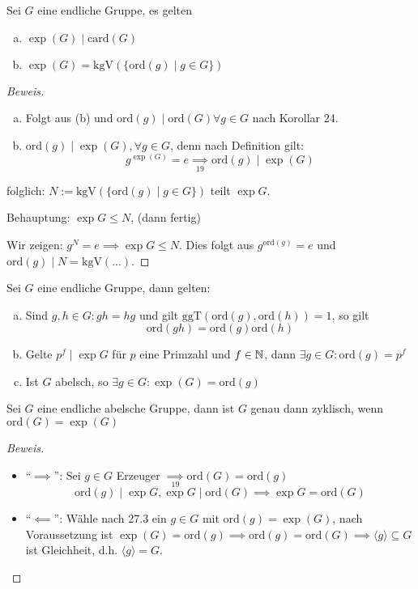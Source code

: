 \documentclass[a4paper]{report}
\begin{document}
\begin{satz}
  Sei $G$ eine endliche Gruppe, es gelten
  \begin{enumerate}[(a)]
    \item $\exp(G) \mid \mathrm{card}(G)$
    \item $\exp(G) = \mathrm{kgV}(\{\mathrm{ord}(g)\mid g \in G\})$
  \end{enumerate}
\begin{proof}[Beweis] \item
\begin{enumerate}[(a)]
\item Folgt aus (b) und $\mathrm{ord}(g) \mid \mathrm{ord}(G) \forall g \in G$ nach Korollar 24.
\item $\mathrm{ord}(g) \mid \exp(G), \forall g \in G$, denn nach Definition gilt:
$$g^{\exp(G)} = e \underset{19} \implies \mathrm{ord}(g ) \mid \exp(G)$$
\end{enumerate}
folglich: $N:= \mathrm{kgV}(\{\mathrm{ord}(g) \mid g \in G\})$ teilt $\exp G$.

        Behauptung: $\exp G \le N$, (dann fertig)

        Wir zeigen: $g^{N} = e \implies \exp G \le N$.
Dies folgt aus $g^{\mathrm{ord}(g)} = e$ und $\mathrm{ord}(g) \mid N = \mathrm{kgV}(...).$
\end{proof}
\end{satz}

\begin{ubng}%
  Sei $G$ eine endliche Gruppe, dann gelten:
  \begin{enumerate}[(a)]
    \item Sind $g,h \in G : gh = hg$ und gilt $\mathrm{ggT}(\mathrm{ord}(g), \mathrm{ord}(h)) = 1$, so gilt $$\mathrm{ord}(gh) = \mathrm{ord}(g)\mathrm{ord}(h)$$
    \item Gelte $p^{f} \mid \exp G$ für $p$ eine Primzahl und $f \in \Bbb N$, dann $\exists g \in G : \mathrm{ord}(g) = p^{f}$
    \item Ist $G$ abelsch, so $\exists g \in G : \exp (G) = \mathrm{ord}(g)$
  \end{enumerate}
\end{ubng}

\begin{satz}
Sei $G$ eine endliche abelsche Gruppe, dann ist $G$ genau dann zyklisch, wenn $\mathrm{ord}(G) = \exp(G)$
\begin{proof}[Beweis] \item
\begin{itemize}
\item ``$\implies$'': Sei $g \in G$ Erzeuger $\underset{19}\implies \mathrm{ord}(G) = \mathrm{ord}(g)$
$$\mathrm{ord}(g) \mid \exp G, \exp G \mid \mathrm{ord}(G) \implies \exp G = \mathrm{ord}(G)$$
\item ``$\impliedby$'': Wähle nach 27.3 ein $g \in G$ mit $\mathrm{ord}(g) = \exp(G)$, nach Voraussetzung ist $\exp(G) = \mathrm{ord}(g) \implies \mathrm{ord}(g) = \mathrm{ord}(G) \implies \langle g \rangle \subseteq G$ ist Gleichheit, d.h. $\langle g \rangle = G.$
\end{itemize}
\end{proof}
\end{satz}
\end{document}
